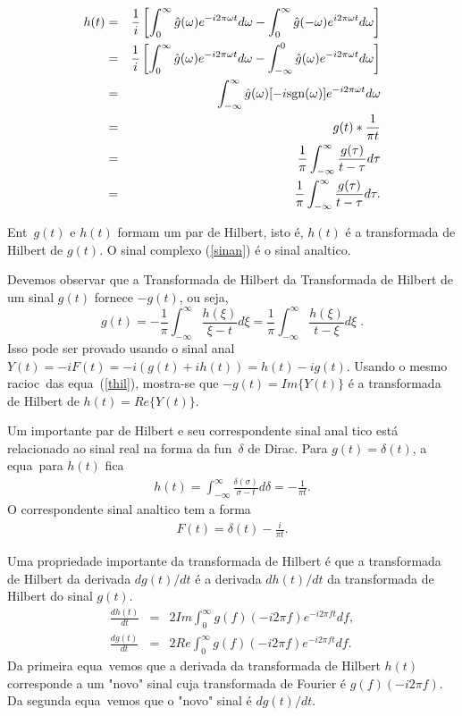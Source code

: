 \begin{eqnarray}
h(t) &=& \frac{1}{i}\left[\int_{0}^{\infty}\hat{g}(\omega)e^{-i2\pi \omega t}d\omega -
\int_{0}^{\infty}\hat{g}(-\omega)e^{i2\pi \omega t}d\omega  \right]\nonumber \\
&=& \frac{1}{i}\left[\int_{0}^{\infty}\hat{g}(\omega)e^{-i2\pi \omega t}d\omega -
\int_{-\infty}^{0}\hat{g}(\omega)e^{-i2\pi \omega t}d\omega  \right]\nonumber \\
&=& \int_{-\infty}^{\infty}\hat{g}(\omega) [-i\mbox{sgn}(\omega)]e^{-i2\pi \omega t}d\omega
\nonumber \\
&=& g(t) * \frac{1}{\pi t}\nonumber \\
&=&
\frac{1}{\pi}\int_{-\infty}^{\infty}\frac{g(\tau)}{t-\tau}d\tau
\nonumber \\
&=& \frac{1}{\pi}\int_{-\infty}^{\infty}\frac{g(\tau)}{t -
\tau}d\tau.
\label{thil}
\end{eqnarray}

Ent\ao\ $g(t)$ e $h(t)$ formam um par de Hilbert, isto \'e, $h(t)$ \'e
a transformada de Hilbert de $g(t)$. O sinal complexo (\ref{sinan})
\'e o sinal anal\ih tico.


Devemos observar que a Transformada de Hilbert da Transformada de
Hilbert de um sinal $g(t)$ fornece $-g(t)$, ou seja,
\begin{equation}
g(t) = - \frac{1}{\pi} \int_{-\infty}^{\infty} \frac{h(\xi)}{\xi-t}d\xi
= \frac{1}{\pi} \int_{-\infty}^{\infty} \frac{h(\xi)}{t-\xi}d\xi \; .
\label{thth}
\end{equation}
Isso pode ser provado usando o sinal anal\itico\ $Y(t) = -iF(t) = -i
(g(t) + ih(t)) = h(t) - i g(t)$. Usando o mesmo racioc\inio\ das equa\coes\
(\ref{thil}), mostra-se que $-g(t)=Im \{Y(t)\}$ \'e a transformada de
Hilbert de $h(t)=Re\{Y(t)\}$.

Um importante par de Hilbert e seu correspondente sinal anal\ih
tico est\'a relacionado ao sinal real na forma da fun\cao\
$\delta$ de Dirac. Para $g(t) = \delta(t)$, a equa\cao\ para
$h(t)$ fica
\begin{eqnarray}
h(t) = \int_{-\infty}^{\infty}\frac{\delta(\sigma)}{\sigma - t}d\delta
= -\frac{1}{\pi t}.
\end{eqnarray}
O correspondente sinal anal\ih tico tem a forma
\begin{eqnarray}
F(t) = \delta(t) - \frac{i}{\pi t}.
\end{eqnarray}

Uma propriedade importante da transformada de Hilbert \'e que a
transformada de Hilbert da derivada $dg(t)/dt$ \'e a derivada
$dh(t)/dt$ da transformada de Hilbert do sinal $g(t)$.
\begin{eqnarray}
\frac{dh(t)}{dt} &=& 2Im\int_{0}^{\infty}g(f)(-i2\pi f)e^{-i2\pi
ft}df, \\
\frac{dg(t)}{dt} &=& 2Re\int_{0}^{\infty}g(f)(-i2\pi f)e^{-i2\pi
ft}df.
\end{eqnarray}
Da primeira equa\cao\ vemos que a derivada da transformada de
Hilbert $h(t)$ corresponde a um "novo" sinal cuja transformada de
Fourier \'e $g(f)(-i2\pi f)$. Da segunda equa\cao\ vemos que o
"novo" sinal \'e $dg(t)/dt$.



